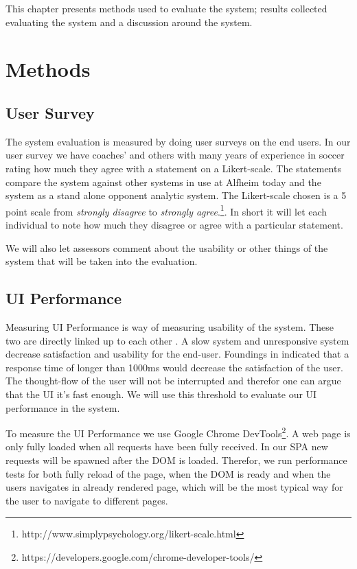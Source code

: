 This chapter presents methods used to evaluate the system; results collected evaluating the system and a discussion around the system. 

\section{Methods}
\subsection{User Survey}

The system evaluation is measured by doing user surveys on the end users. In our user survey we have coaches’ and others with many years of experience in soccer rating how much they agree with a statement on a Likert-scale. The statements compare the system against other systems in use at Alfheim today and the system as a stand alone opponent analytic system. The Likert-scale chosen is a 5 point scale from \textit{strongly disagree} to \textit{strongly agree}.\footnote{http://www.simplypsychology.org/likert-scale.html}. In short it will let each individual to note how much they disagree or agree with a particular statement.

We will also let assessors comment about the usability or other things of the system that will be taken into the evaluation. 

\subsection{UI Performance}

Measuring \ac{UI} Performance is way of measuring usability of the system. These two are directly linked up to each other \cite{satisfaction}. A slow system and unresponsive system decrease satisfaction and usability for the end-user. Foundings in \cite{nielsen} indicated that a response time of longer than 1000ms would decrease the satisfaction of the user. The thought-flow of the user will not be interrupted and therefor one can argue that the \ac{UI} it's fast enough. We will use this threshold to evaluate our UI performance in the system.

To measure the UI Performance we use Google Chrome DevTools\footnote{https://developers.google.com/chrome-developer-tools/}. A web page is only fully loaded when all requests have been fully received. In our \ac{SPA} new requests will be spawned after the \ac{DOM} is loaded. Therefor, we run performance tests for both fully reload of the page, when the DOM is ready and when the users navigates in already rendered page, which will be the most typical way for the user to navigate to different pages.

